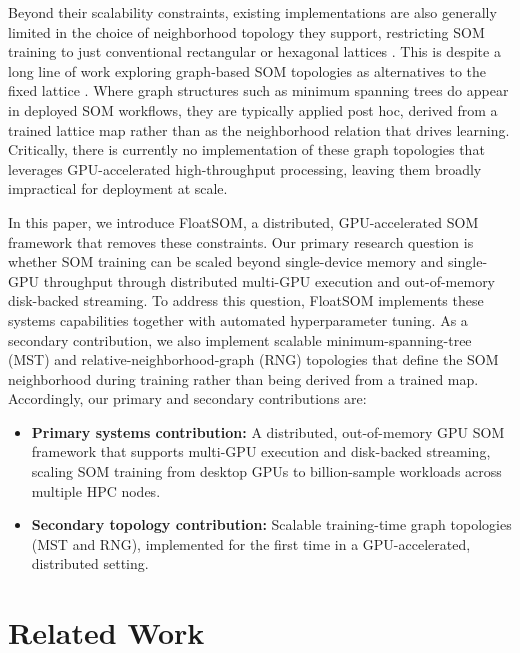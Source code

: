 \documentclass[10pt]{article} %
\begin{document}
Beyond their scalability constraints, existing implementations are also generally limited in the choice of neighborhood topology they support, restricting SOM training to just conventional rectangular or hexagonal lattices \citep{kohonenSelforganizingMap1990,kohonenEssentialsSelforganizingMap2013}. This is despite a long line of work exploring graph-based SOM topologies as alternatives to the fixed lattice \citep{alahakoonDynamicSelforganizingMaps2000,vasighiDirectedBatchGrowing2017,kangasVariantsSelforganizingMaps1990,spanakisAMSOMAdaptiveMoving2016}. Where graph structures such as minimum spanning trees do appear in deployed SOM workflows, they are typically applied post hoc, derived from a trained lattice map \citep{vangassenFlowSOMUsingSelforganizing2015,jangUseMinimalSpanning2009} rather than as the neighborhood relation that drives learning. Critically, there is currently no implementation of these graph topologies that leverages GPU-accelerated high-throughput processing, leaving them broadly impractical for deployment at scale.

In this paper, we introduce FloatSOM, a distributed, GPU-accelerated SOM framework that removes these constraints. Our primary research question is whether SOM training can be scaled beyond single-device memory and single-GPU throughput through distributed multi-GPU execution and out-of-memory disk-backed streaming. To address this question, FloatSOM implements these systems capabilities together with automated hyperparameter tuning. As a secondary contribution, we also implement scalable minimum-spanning-tree (MST) and relative-neighborhood-graph (RNG) topologies that define the SOM neighborhood during training rather than being derived from a trained map. Accordingly, our primary and secondary contributions are:

\begin{itemize}
\item \textbf{Primary systems contribution:} A distributed, out-of-memory GPU SOM framework that supports multi-GPU execution and disk-backed streaming, scaling SOM training from desktop GPUs to billion-sample workloads across multiple HPC nodes.
\item \textbf{Secondary topology contribution:} Scalable training-time graph topologies (MST and RNG), implemented for the first time in a GPU-accelerated, distributed setting.
\end{itemize}

\section{Related Work}
\end{document}
